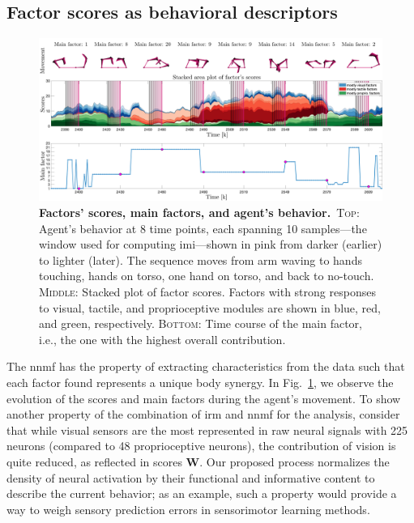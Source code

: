 \documentclass[letterpaper, 10 pt, conference]{ieeeconf}  %
\begin{document}
\subsection{Factor scores as behavioral descriptors}
\begin{figure}[h!]
    \centering
    \includegraphics[width=.99\textwidth]{fig/factors_example_time_v2.png}
    \caption{\textbf{Factors' scores, main factors, and agent's behavior.}~\textsc{Top}: Agent’s behavior at 8 time points, each spanning 10 samples—the window used for computing \ac{imi}---shown in pink from darker (earlier) to lighter (later). The sequence moves from arm waving to hands touching, hands on torso, one hand on torso, and back to no-touch. \textsc{Middle}: Stacked plot of factor scores. Factors with strong responses to visual, tactile, and proprioceptive modules are shown in blue, red, and green, respectively. \textsc{Bottom}: Time course of the main factor, i.e., the one with the highest overall contribution.}    
    \label{fig:factors_time}
\end{figure}
The \acl{nnmf} has the property of extracting characteristics from the data such that each factor found represents a unique body synergy. In Fig.~\ref{fig:factors_time}, we observe the evolution of the scores and main factors during the agent's movement. To show another property of the combination of \ac{irm} and \ac{nnmf} for the analysis, consider that while visual sensors are the most represented in raw neural signals with 225 neurons (compared to 48 proprioceptive neurons), the contribution of vision is quite reduced, as reflected in scores $\bm{W}$. Our proposed process normalizes the density of neural activation by their functional and informative content to describe the current behavior; as an example, such a property would provide a way to weigh sensory prediction errors in sensorimotor learning methods.
\end{document}
